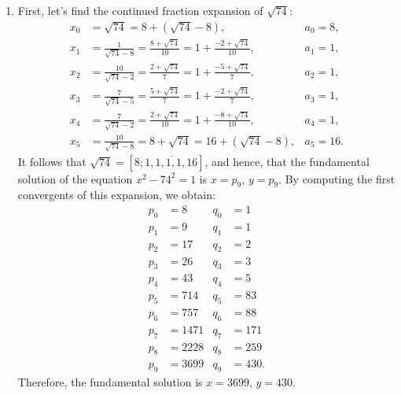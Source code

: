 \begin{solution}
\begin{enumerate}
\begin{align*}
            p_3 &= 397 & q_3 &= 62 \\
            p_4 &= 826 & q_4 &= 129 \\
            p_5 &= 2049 & q_5 &= 320.
        \end{align*}
        Therefore, the fundamental solution is $x = 2049$, $y = 320$.
        \item First, let's find the continued fraction expansion of $\sqrt{74}$:
        \begin{align*}
            x_0 &= \sqrt{74} = 8 + (\sqrt{74} - 8), & a_0 = 8, \\
            x_1 &= \frac{1}{\sqrt{74} - 8} = \frac{8+\sqrt{74}}{10} = 1 + \frac{-2 + \sqrt{74}}{10}, & a_1 = 1, \\
            x_2 &= \frac{10}{\sqrt{74} - 2} = \frac{2 +\sqrt{74}}{7} = 1 + \frac{-5 + \sqrt{74}}{7}, & a_2 = 1, \\
            x_3 &= \frac{7}{\sqrt{74} - 5} = \frac{5 + \sqrt{74}}{7} = 1 + \frac{-2 + \sqrt{74}}{7}, & a_3 = 1, \\
            x_4 &= \frac{7}{\sqrt{74} - 2} = \frac{2 + \sqrt{74}}{10} = 1 + \frac{-8 + \sqrt{74}}{10}, & a_4 = 1, \\
            x_5 &= \frac{10}{\sqrt{74} - 8} = 8 + \sqrt{74} = 16 + (\sqrt{74} - 8), & a_5 = 16.
        \end{align*}
        It follows that $\sqrt{74} = [8; \overline{1, 1, 1, 1, 16}]$, and hence, that the fundamental solution of the equation $x^2 - 74^2 = 1$ is $x = p_9$, $y = p_9$. By computing the first convergents of this expansion, we obtain:
        \begin{align*}
            p_0 &= 8 & q_0 &= 1 \\
            p_1 &= 9 & q_1 &= 1  \\
            p_2 &= 17 & q_2 &= 2 \\
            p_3 &= 26 & q_3 &= 3 \\
            p_4 &= 43 & q_4 &= 5 \\
            p_5 &= 714 & q_5 &= 83 \\
            p_6 &= 757 & q_6 &= 88 \\
            p_7 &= 1471 & q_7 &= 171 \\
            p_8 &= 2228 & q_8 &= 259 \\
            p_9 &= 3699 & q_9 &= 430.
        \end{align*}
        Therefore, the fundamental solution is $x = 3699$, $y = 430$. \\
    \end{enumerate}
\end{solution}

